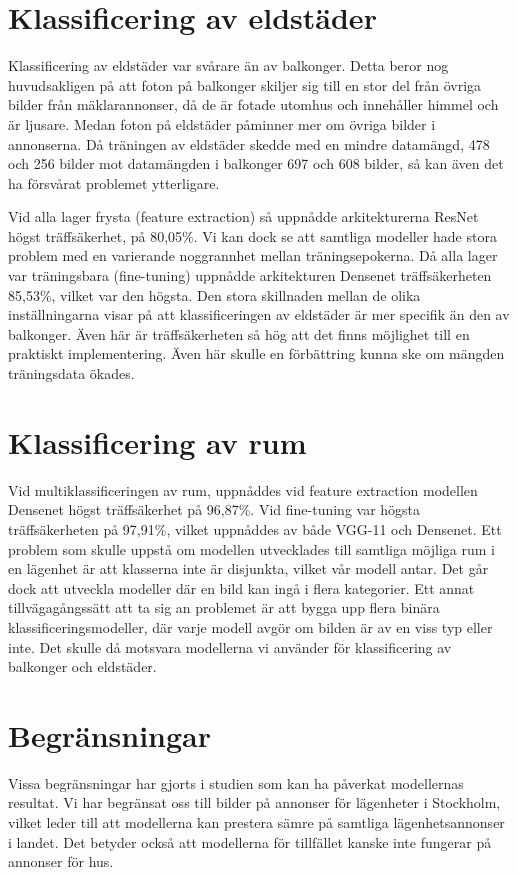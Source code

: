 \documentclass[]{kththesis}
\begin{document}
\section{Klassificering av eldstäder}
Klassificering av eldstäder var svårare än av balkonger. Detta beror nog huvudsakligen på att foton på balkonger skiljer sig till en stor del från övriga bilder från mäklarannonser, då de är fotade utomhus och innehåller himmel och är ljusare. Medan foton på eldstäder påminner mer om övriga bilder i annonserna. Då träningen av eldstäder skedde med en mindre datamängd, 478 och 256 bilder mot datamängden i balkonger 697 och 608 bilder, så kan även det ha försvårat problemet ytterligare. 

Vid alla lager frysta (feature extraction) så uppnådde arkitekturerna ResNet högst träffsäkerhet, på 80,05\%. Vi kan dock se att samtliga modeller hade stora problem med en varierande noggrannhet mellan träningsepokerna. Då alla lager var träningsbara (fine-tuning) uppnådde arkitekturen Densenet träffsäkerheten 85,53\%, vilket var den högsta. Den stora skillnaden mellan de olika inställningarna visar på att klassificeringen av eldstäder är mer specifik än den av balkonger. Även här är träffsäkerheten så hög att det finns möjlighet till en praktiskt implementering. Även här skulle en förbättring kunna ske om mängden träningsdata ökades.

\section{Klassificering av rum}
Vid multiklassificeringen av rum, uppnåddes vid feature extraction modellen Densenet högst träffsäkerhet på 96,87\%. Vid fine-tuning var högsta träffsäkerheten på 97,91\%, vilket uppnåddes av både VGG-11 och Densenet. Ett problem som skulle uppstå om modellen utvecklades till samtliga möjliga rum i en lägenhet är att klasserna inte är disjunkta, vilket vår modell antar. Det går dock att utveckla modeller där en bild kan ingå i flera kategorier. Ett annat tillvägagångssätt att ta sig an problemet är att bygga upp flera binära klassificeringsmodeller, där varje modell avgör om bilden är av en viss typ eller inte. Det skulle då motsvara modellerna vi använder för klassificering av balkonger och eldstäder. 

\section{Begränsningar}
Vissa begränsningar har gjorts i studien som kan ha påverkat modellernas resultat. Vi har begränsat oss till bilder på annonser för lägenheter i Stockholm, vilket leder till att modellerna kan prestera sämre på samtliga lägenhetsannonser i landet. Det betyder också att modellerna för tillfället kanske inte fungerar på annonser för hus.
\end{document}
